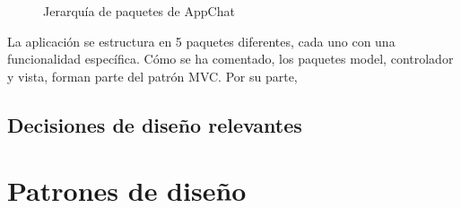 \documentclass[11pt]{article}
\begin{document}
\begin{figure}[H]
	\centering
	\caption{Jerarquía de paquetes de AppChat}
	\label{fig:paquetes}
\end{figure}

La aplicación se estructura en 5 paquetes diferentes, cada uno con una funcionalidad específica. Cómo se ha comentado, los paquetes model, controlador y vista, forman parte del patrón MVC. Por su parte, 

\subsection{Decisiones de diseño relevantes}



\section{Patrones de diseño}
\end{document}
